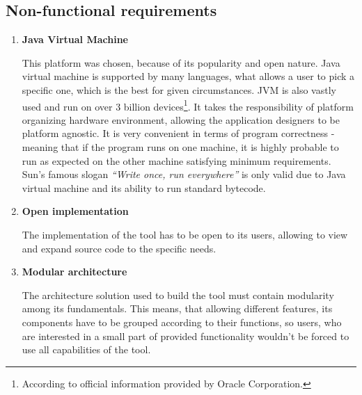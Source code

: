 \subsection{Non-functional requirements}
\begin{enumerate}
\item \textbf{Java Virtual Machine}

This platform was chosen, because of its popularity and open nature. Java virtual machine is supported by many languages, what allows a user to pick a specific one, which is the best for given circumstances. JVM is also vastly used and run on over 3 billion devices\footnote{According to official information provided by Oracle Corporation.}. It takes the responsibility of platform organizing hardware environment, allowing the application designers to be platform agnostic. It is very convenient in terms of program correctness - meaning that if the program runs on one machine, it is highly probable to run as expected on the other machine satisfying minimum requirements. Sun's famous slogan \textit{``Write once, run everywhere''} is only valid due to Java virtual machine and its ability to run standard bytecode.
\medbreak

\item \textbf{Open implementation}

The implementation of the tool has to be open to its users, allowing to view and expand source code to the specific needs. 
\medbreak

\item \label{nfreq:modul}\textbf{Modular architecture}

The architecture solution used to build the tool must contain modularity among its fundamentals. This means, that allowing different features, its components have to be grouped according to their functions, so users, who are interested in a small part of provided functionality wouldn't be forced to use all capabilities of the tool.

\end{enumerate}


